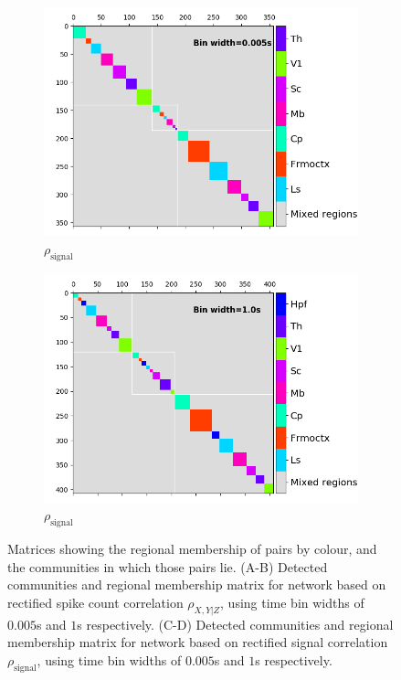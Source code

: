 \begin{figure}[p]
\begin{subfigure}[h]{0.5\linewidth}
      \includegraphics[width=\linewidth]{figures/eight_probe/Krebs_0p005_signal_rectified_regional_cluster_map.png}
      \caption{$\rho_{\text{signal}}$}
      \label{fig:short_time_signal_rectified_regional_clusters}
    \end{subfigure}
    \begin{subfigure}[h]{0.5\linewidth}
      \includegraphics[width=\linewidth]{figures/eight_probe/Krebs_1p0_signal_rectified_regional_cluster_map.png}
      \caption{$\rho_{\text{signal}}$}
      \label{fig:long_time_signal_rectified_regional_clusters}
    \end{subfigure}
    \caption{Matrices showing the regional membership of pairs by colour, and the communities in which those pairs lie. (A-B) Detected communities and regional membership matrix for network based on rectified spike count correlation $\rho_{X,Y|Z}$, using time bin widths of $0.005$s and $1$s respectively. (C-D) Detected communities and regional membership matrix for network based on rectified signal correlation $\rho_{\text{signal}}$, using time bin widths of $0.005$s and $1$s respectively.}
    \label{fig:rectified_signal_regional_clusters}
  \end{figure}

